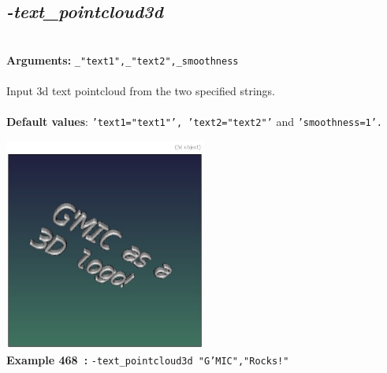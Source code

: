 \documentclass[a4paper,11pt,twoside]{book}
\begin{document}
\subsection{\emph{-text\_pointcloud3d} }\vspace*{-0.5em}
~\\\textbf{Arguments: } 
{\small \texttt{\_"text1",\_"text2",\_smoothness}}\\~\\
Input 3d text pointcloud from the two specified strings.
~\\~\\\textbf{Default values}: {\small \texttt{'text1="text1"', 'text2="text2"'} and \texttt{'smoothness=1'.}}
\begin{center}\includegraphics[keepaspectratio=true,height=7cm,width=\textwidth]{img/gmic_def468.jpg}\\
{\footnotesize \textbf{Example 468~:} \texttt{-text\_pointcloud3d "G'MIC","Rocks!"}}
\end{center}
\end{document}
